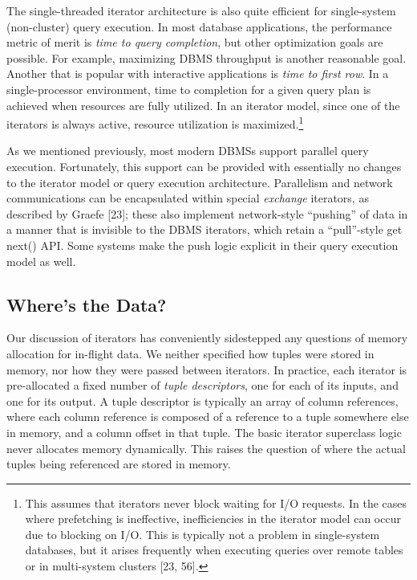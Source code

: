 \documentclass[a4paper,11pt,twoside,openright]{book}
\begin{document}
The single-threaded iterator architecture is also quite efficient for
single-system (non-cluster) query execution. In most database
applications, the performance metric of merit is \emph{time to query
completion}, but other optimization goals are possible. For example,
maximizing DBMS throughput is another reasonable goal. Another that is
popular with interactive applications is \emph{time to first row}. In a
single-processor environment, time to completion for a given query plan
is achieved when resources are fully utilized. In an iterator model,
since one of the iterators is always active, resource utilization is
maximized.\footnote{This assumes that iterators never block waiting for I/O requests. In
the cases where prefetching is ineffective, inefficiencies in the
iterator model can occur due to blocking on I/O. This is typically not
a problem in single-system databases, but it arises frequently when
executing queries over remote tables or in multi-system clusters
{[}23, 56{]}.}

As we mentioned previously, most modern DBMSs support parallel query
execution. Fortunately, this support can be provided with essentially no
changes to the iterator model or query execution architecture.
Parallelism and network communications can be encapsulated within
special \emph{exchange} iterators, as described by Graefe {[}23{]};
these also implement network-style ``pushing'' of data in a manner that
is invisible to the DBMS iterators, which retain a ``pull''-style get
next() API. Some systems make the push logic explicit in their query
execution model as well.

\hypertarget{wheres-the-data}{%
\subsection{Where's the Data?}\label{wheres-the-data}}

Our discussion of iterators has conveniently sidestepped any questions
of memory allocation for in-flight data. We neither specified how tuples
were stored in memory, nor how they were passed between iterators. In
practice, each iterator is pre-allocated a fixed number of \emph{tuple
descriptors}, one for each of its inputs, and one for its output. A
tuple descriptor is typically an array of column references, where each
column reference is composed of a reference to a tuple somewhere else in
memory, and a column offset in that tuple. The basic iterator superclass
logic never allocates memory dynamically. This raises the question of
where the actual tuples being referenced are stored in memory.
\end{document}
